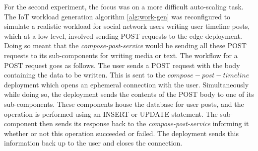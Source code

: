 For the second experiment, the focus was on a more difficult auto-scaling task. The IoT workload generation algorithm \ref{alg:work-gen} was reconfigured to simulate a realistic workload for social network users writing user timeline posts, which at a low level, involved sending POST requests to the edge deployment. Doing so meant that the \textit{compose-post-service} would be sending all these POST requests to its sub-components for writing media or text. The workflow for a POST request goes as follows. The user sends a POST request with the body containing the data to be written. This is sent to the $compose-post-timeline$ deployment which opens an ephemeral connection with the user. Simultaneously while doing so, the deployment sends the contents of the POST body to one of its sub-components. These components house the database for user posts, and the operation is performed using an INSERT or UPDATE statement. The sub-component then sends its response back to the \textit{compose-post-service} informing it whether or not this operation succeeded or failed. The deployment sends this information back up to the user and closes the connection.\par

\begin{center}
\begin{minipage}{\linewidth}
    \label{fig:exp2-workload}
\end{minipage}
\end{center}

